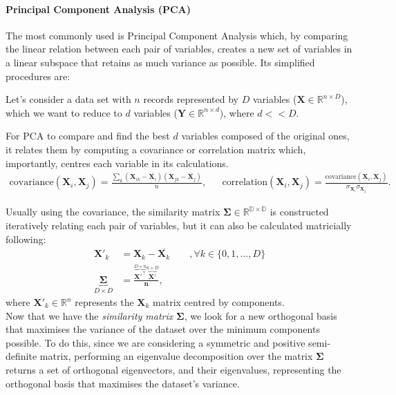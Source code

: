     \paragraph{Principal Component Analysis (PCA)}
        The most commonly used is Principal Component Analysis \cite{pca} which, by comparing the linear relation between each pair of variables, creates a new set of variables in a linear subspace that retains as much variance as possible. Its simplified procedures are:
        
        Let's consider a data set with $n$ records represented by $D$ variables ($\bm{X}\in\mathbb{R}^{n\times D}$), which we want to reduce to $d$ variables ($\bm{Y}\in\mathbb{R}^{n\times d}$), where $d << D$.
        
        For PCA to compare and find the best $d$ variables composed of the original ones, it relates them by computing a covariance or correlation matrix which, importantly, centres each variable in its calculations.
        \begin{align}
            \text{covariance}(\bm{X}_i, \bm{X}_j) = \frac{\sum_k (\bm{X}_{ik} - \overline{\bm{X}_i})(\bm{X}_{jk} - \overline{\bm{X}_j})}{n}, &&
            \text{correlation}(\bm{X}_i, \bm{X}_j) = \frac{\text{covariance}(\bm{X}_i, \bm{X}_j)}{\sigma_{\bm{X}_i}\sigma_{\bm{X}_j}}.
        \end{align}
        
        Usually using the covariance, the similarity matrix $\bm{\Sigma}\in\mathbb{R^{D\times D}}$ is constructed iteratively relating each pair of variables, but it can also be calculated matricially following: \\
        \begin{align}
            \bm{X'}_k &= \bm{X}_k - \overline{\bm{X}_k} \qquad, \forall k \in \{0, 1, \ldots, D\} \\
            \underbrace{\bm{\Sigma}}_{D\times D} &= \frac{\overbrace{\bm{X'}^\top}^{D\times n}\overbrace{\bm{X'}}^{n\times D}}{\bm{n}},
            \label{eq: Sigma}
        \end{align}
        where $\bm{X'}_k\in\mathbb{R}^n$ represents the $\bm{X}_k$ matrix centred by components. \\
        
        Now that we have the \textit{similarity matrix} $\bm{\Sigma}$, we look for a new orthogonal basis that maximises the variance of the dataset over the minimum components possible. To do this, since we are considering a symmetric and positive semi-definite matrix, performing an eigenvalue decomposition over the matrix $\bm{\Sigma}$ returns a set of orthogonal eigenvectors, and their eigenvalues, representing the orthogonal basis that maximises the dataset's variance.
        
